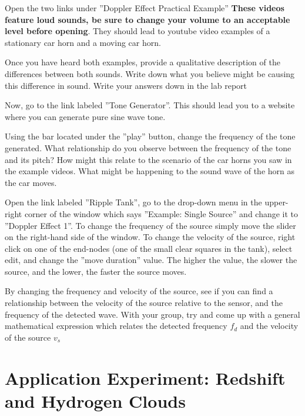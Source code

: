 \begin{steps}
	\item Open the two links under ''Doppler Effect Practical Example'' \textbf{These videos feature loud sounds, be sure to change your volume to an acceptable level before opening}. They should lead to youtube video examples of a stationary car horn and a moving car horn.
	
	\item Once you have heard both examples, provide a qualitative description of the differences between both sounds. Write down what you believe might be causing this difference in sound. Write your answers down in the lab report
	
	\item Now, go to the link labeled ''Tone Generator''. This should lead you to a website where you can generate pure sine wave tone. 
	
	\item Using the bar located under the ''play'' button, change the frequency of the tone generated. What relationship do you observe between the frequency of the tone and its pitch? How might this relate to the scenario of the car horns you saw in the example videos. What might be happening to the sound wave of the horn as the car moves. 
	
	\item Open the link labeled ''Ripple Tank'', go to the drop-down menu in the upper-right corner of the window which says ''Example: Single Source'' and change it to ''Doppler Effect 1''. To change the frequency of the source simply move the slider on the right-hand side of the window. To change the velocity of the source, right click on one of the end-nodes (one of the small clear squares in the tank), select edit, and change the ''move  duration'' value. The higher the value, the slower the source, and the lower, the faster the source moves. 
	
	\item By changing the frequency and velocity of the source, see if you can find a relationship between the velocity of the source relative to the sensor, and the frequency of the detected wave. With your group, try and come up with a general mathematical expression which relates the detected frequency $f_{d}$ and the velocity of the source $v_{s}$

\end{steps}

\section{Application Experiment: Redshift and Hydrogen Clouds}

